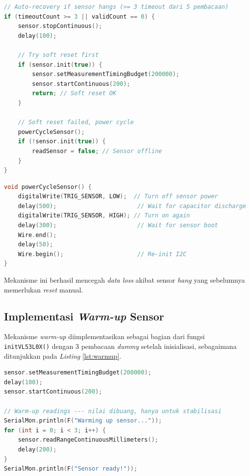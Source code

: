 \begin{lstlisting}[caption={Implementasi \textit{Auto-recovery} Sensor}, label={lst:recovery}, language=C++]
// Auto-recovery if sensor hangs (>= 3 timeout dari 5 pembacaan)
if (timeoutCount >= 3 || validCount == 0) {
    sensor.stopContinuous();
    delay(100);

    // Try soft reset first
    if (sensor.init(true)) {
        sensor.setMeasurementTimingBudget(200000);
        sensor.startContinuous(200);
        return; // Soft reset OK
    }

    // Soft reset failed, power cycle
    powerCycleSensor();
    if (!sensor.init(true)) {
        readSensor = false; // Sensor offline
    }
}
\end{lstlisting}

\begin{lstlisting}[caption={Implementasi \textit{Power Cycle} Sensor}, label={lst:powercycle}, language=C++]
void powerCycleSensor() {
    digitalWrite(TRIG_SENSOR, LOW);  // Turn off sensor power
    delay(500);                       // Wait for capacitor discharge
    digitalWrite(TRIG_SENSOR, HIGH); // Turn on again
    delay(300);                       // Wait for sensor boot
    Wire.end();
    delay(50);
    Wire.begin();                     // Re-init I2C
}
\end{lstlisting}

Mekanisme ini berhasil mencegah \textit{data loss} akibat sensor \textit{hang} yang sebelumnya memerlukan \textit{reset} manual.

\subsection{Implementasi \textit{Warm-up} Sensor}

Mekanisme \textit{warm-up} diimplementasikan sebagai bagian dari fungsi \texttt{initVL53L0X()} dengan 3 pembacaan \textit{dummy} setelah inisialisasi, sebagaimana ditunjukkan pada \textit{Listing} \ref{lst:warmup}.

\begin{lstlisting}[caption={Implementasi \textit{Warm-up} Sensor}, label={lst:warmup}, language=C++]
sensor.setMeasurementTimingBudget(200000);
delay(100);
sensor.startContinuous(200);

// Warm-up readings --- nilai dibuang, hanya untuk stabilisasi
SerialMon.println(F("Warming up sensor..."));
for (int i = 0; i < 3; i++) {
    sensor.readRangeContinuousMillimeters();
    delay(200);
}
SerialMon.println(F("Sensor ready!"));
\end{lstlisting}

